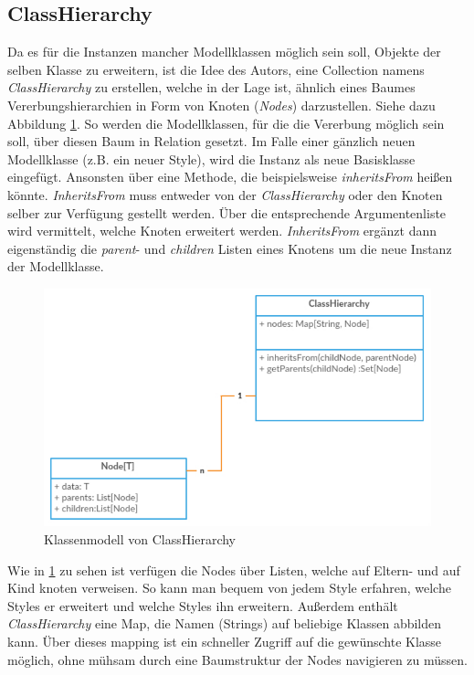 \subsection{ClassHierarchy}Da es für die Instanzen mancher Modellklassen möglich sein soll, Objekte der selben Klasse zu erweitern, ist die Idee des Autors, eine Collection namens \textit{ClassHierarchy} zu erstellen, welche in der Lage ist, ähnlich eines Baumes Vererbungshierarchien in Form von Knoten (\textit{Nodes}) darzustellen. Siehe dazu Abbildung \ref{classhierarchy}. So werden die Modellklassen, für die die Vererbung möglich sein soll, über diesen Baum in Relation gesetzt. Im Falle einer gänzlich neuen Modellklasse (z.B. ein neuer Style), wird die Instanz als neue Basisklasse eingefügt. Ansonsten über eine Methode, die beispielsweise \textit{inheritsFrom} heißen könnte. \textit{InheritsFrom} muss entweder von der \textit{ClassHierarchy} oder den Knoten selber zur Verfügung gestellt werden. Über die entsprechende Argumentenliste wird vermittelt, welche Knoten erweitert werden. \textit{InheritsFrom} ergänzt dann eigenständig die \textit{parent}- und \textit{children} Listen eines Knotens um die neue Instanz der Modellklasse.
\begin{figure}[H]
\begin{center}
\includegraphics[scale = 0.7]{Bilder/classhierarchy.pdf}
\caption{Klassenmodell von ClassHierarchy}
\label{classhierarchy}
\end{center}
\end{figure}Wie in \ref{classhierarchy} zu sehen ist verfügen die Nodes über Listen, welche auf Eltern- und auf Kind knoten verweisen. So kann man bequem von jedem Style erfahren, welche Styles er erweitert und welche Styles ihn erweitern. Außerdem enthält \textit{ClassHierarchy} eine Map, die Namen (Strings) auf beliebige Klassen abbilden kann. Über dieses mapping ist ein schneller Zugriff auf die gewünschte Klasse möglich, ohne mühsam durch eine Baumstruktur der Nodes navigieren zu müssen.
